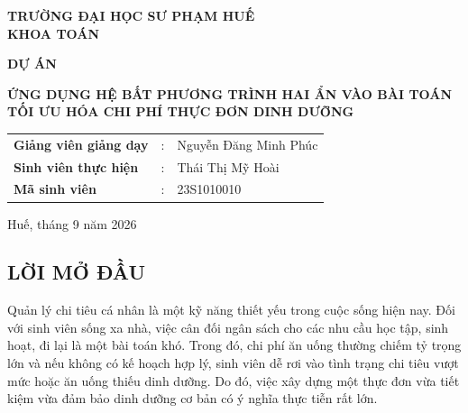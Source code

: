 \documentclass[12pt,a4paper]{article}
\begin{document}
\begin{titlepage}

    \centering

    \vspace*{1.5cm}

    {\large \textbf{TRƯỜNG ĐẠI HỌC SƯ PHẠM HUẾ}}\\[0.3cm]
    {\large \textbf{KHOA TOÁN}}

    \vspace{2.5cm}

    {\Large \textbf{DỰ ÁN}}

    \vspace{1cm}

    {\LARGE \textbf{
    ỨNG DỤNG HỆ BẤT PHƯƠNG TRÌNH HAI ẨN
    VÀO BÀI TOÁN TỐI ƯU HÓA CHI PHÍ
    THỰC ĐƠN DINH DƯỠNG
    }}

    \vspace{2cm}

    {\large
    \begin{tabular}{lcl}
        \textbf{Giảng viên giảng dạy} & : & Nguyễn Đăng Minh Phúc\\[0.3cm]
        \textbf{Sinh viên thực hiện} & : & Thái Thị Mỹ Hoài\\[0.3cm]
        \textbf{Mã sinh viên} & : & 23S1010010
    \end{tabular}
    }

    \vfill

    {\large Huế, tháng 9 năm 2026}

\end{titlepage}


\begin{center}
    \section*{LỜI MỞ ĐẦU}
\end{center}

Quản lý chi tiêu cá nhân là một kỹ năng thiết yếu trong cuộc sống hiện nay. Đối với sinh viên sống xa nhà, việc cân đối ngân sách cho các nhu cầu học tập, sinh hoạt, đi lại là một bài toán khó. Trong đó, chi phí ăn uống thường chiếm tỷ trọng lớn và nếu không có kế hoạch hợp lý, sinh viên dễ rơi vào tình trạng chi tiêu vượt mức hoặc ăn uống thiếu dinh dưỡng. Do đó, việc xây dựng một thực đơn vừa tiết kiệm vừa đảm bảo dinh dưỡng cơ bản có ý nghĩa thực tiễn rất lớn.
\end{document}
